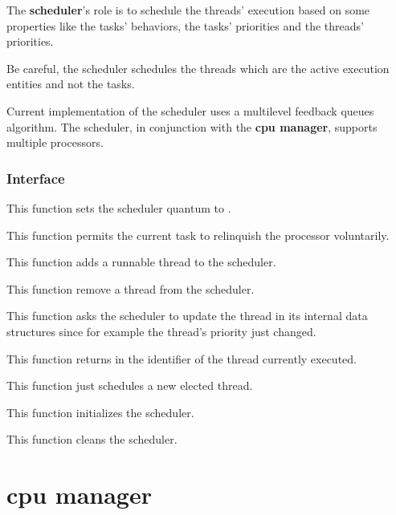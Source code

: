 The \textbf{scheduler}'s role is to schedule the threads' execution
based on some properties like the tasks' behaviors, the tasks' priorities
and the threads' priorities.

Be careful, the scheduler schedules the threads which are the active
execution entities and not the tasks.

Current implementation of the scheduler uses a multilevel feedback
queues algorithm. The scheduler, in conjunction with the \textbf{cpu
manager}, supports multiple processors.

%
%

\subsubsection{Interface}

	 {
	   This function sets the scheduler quantum to .
	 }

	 {
	   This function permits the current task to relinquish
	   the processor voluntarily.
	 }

	 {
	   This function adds a runnable thread to the scheduler.
	 }

	 {
	   This function remove a thread from the scheduler.
	 }

	 {
	   This function asks the scheduler to update the thread
	    in its internal data structures since
	   for example the thread's priority just changed.
	 }

	 {
	   This function returns in  the identifier
	   of the thread currently executed.
	 }

	 {
	   This function just schedules a new elected thread.
	 }

	 {
	   This function initializes the scheduler.
	 }

	 {
	   This function cleans the scheduler.
	 }

%
%

\section{cpu manager}

